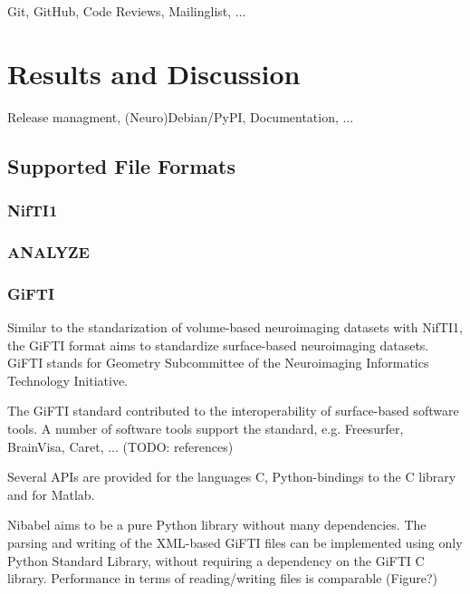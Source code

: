 \documentclass[10pt]{bmc_article}
\newenvironment{bmcformat}{\baselineskip20pt\sloppy\setboolean{publ}{false}}{\baselineskip20pt\sloppy}
\begin{document}
\begin{bmcformat}
Git, GitHub, Code Reviews, Mailinglist, ...

\section{Results and Discussion}

Release managment, (Neuro)Debian/PyPI, Documentation, ...

\subsection{Supported File Formats}

\subsubsection{NifTI1}

\subsubsection{ANALYZE}

\subsubsection{GiFTI}

Similar to the standarization of volume-based neuroimaging datasets with NifTI1,
the GiFTI format aims to standardize surface-based neuroimaging datasets.
GiFTI stands for Geometry Subcommittee of the Neuroimaging Informatics Technology
Initiative.

The GiFTI standard contributed to the interoperability of surface-based software tools.
A number of software tools support the standard, e.g. Freesurfer, BrainVisa, Caret, ...
(TODO: references)

Several APIs are provided for the languages C, Python-bindings to the C library and for Matlab.

Nibabel aims to be a pure Python library without many dependencies. The parsing and
writing of the XML-based GiFTI files can be implemented using only Python Standard Library,
without requiring a dependency on the GiFTI C library. Performance in terms of reading/writing
files is comparable (Figure?)


\end{bmcformat}
\end{document}
